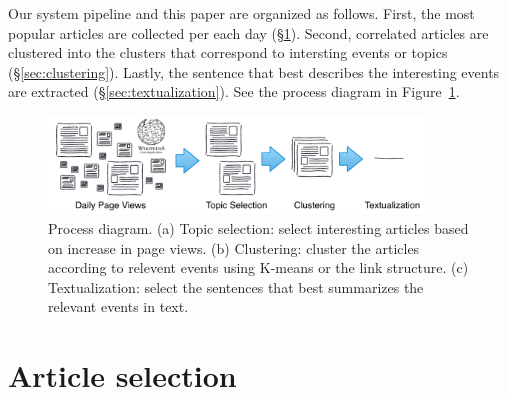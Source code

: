 \documentclass[11pt]{article}
\begin{document}



Our system pipeline and this paper are organized as follows. First, the most popular articles are collected per each day (\S\ref{sec:article-selection}). Second, correlated articles are clustered into the clusters that correspond to intersting events or topics (\S\ref{sec:clustering}). Lastly, the sentence that best describes the interesting events are extracted (\S\ref{sec:textualization}). See the process diagram in Figure~\ref{fig:process}.

\begin{figure}
\centering
\includegraphics[width=0.9\textwidth]{figures/WikiTopicsPipeline.pdf}
\caption{Process diagram.
(a) Topic selection: select interesting articles based on increase in page views.
(b) Clustering: cluster the articles according to relevent events using K-means or the link structure.
(c) Textualization: select the sentences that best summarizes the relevant events in text. }
\label{fig:process}
\end{figure}

\section{Article selection}
\label{sec:article-selection}
\end{document}
